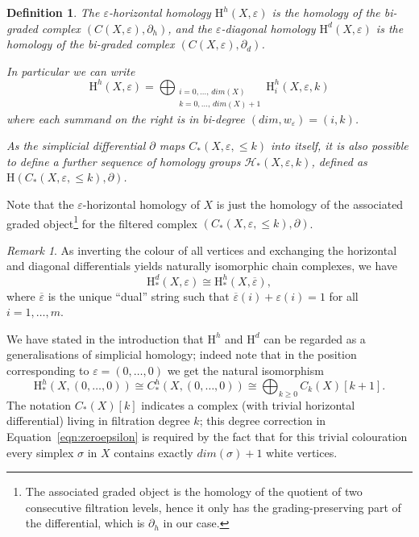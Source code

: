 \documentclass[11pt, a4paper, reqno, twoside, makeidx]{amsart}
\theoremstyle{remark}
\newtheorem{rmk}{Remark}[section]
\theoremstyle{plain}
\newtheorem{defi}[thm]{Definition}
\theoremstyle{definition}
\newcommand{\HH}{\mathrm{H}}
\begin{document}
\begin{defi}\label{def:hordiag}
The \emph{$\varepsilon$-horizontal homology} $\HH^h(X,\varepsilon)$ is the homology of the bi-graded complex $\left(C(X,\varepsilon) , \partial_h \right)$, and the  
\emph{$\varepsilon$-diagonal homology} $\HH^d(X,\varepsilon)$ is the homology of the bi-graded complex $\left(C(X,\varepsilon)  , \partial_d \right)$.

In particular we can write
\begin{equation}
\HH^h(X,\varepsilon) = \bigoplus_{\substack{ i = 0, \ldots,\, dim(X) \\k = 0, \ldots,\, dim(X)+1}} \HH^h_i(X,\varepsilon,k)
\end{equation}
where each summand on the right is in bi-degree $(dim, w_\varepsilon) = (i,k)$.

As the simplicial differential $\partial$ maps $C_*(X,\varepsilon,  \le k)$ into itself,  it is also possible to define a further sequence of homology groups $\mathcal{H}_*(X,\varepsilon,k)$, defined as $\HH\left(C_*(X,\varepsilon,  \le k), \partial \right)$. 
\end{defi}

Note that the $\varepsilon$-horizontal homology of $X$ is just the homology of the associated graded object\footnote{The associated graded object is the homology of the quotient of two consecutive filtration levels, hence it only has the grading-preserving part of the differential, which is $\partial_h$ in our case.} for the filtered complex $\left(C_*(X,\varepsilon,  \le k), \partial \right)$. 

\begin{rmk}\label{rmk:isohordiag}
As inverting the colour of all vertices and exchanging the horizontal and diagonal differentials yields naturally isomorphic chain complexes, we have $$\HH^d_*(X, \varepsilon) \cong \HH^h_*(X,\overline{\varepsilon}),$$ where $\overline{\varepsilon}$ is the unique ``dual'' string such that $\overline{\varepsilon}(i) + \varepsilon(i) = 1$ for all $i = 1, \ldots, m$. 
\end{rmk}


We have stated in the introduction that $\HH^h$ and $\HH^d$ can be regarded as a generalisations of simplicial homology; indeed note that in the position corresponding to $\varepsilon = (0,\ldots, 0)$ we get the natural isomorphism
\begin{equation}\label{eqn:zeroepsilon}
\HH^h_*(X,(0,\ldots, 0)) \cong C^h_*(X,(0,\ldots, 0))  \cong \bigoplus_{k \ge 0} C_k(X)[k+1].
\end{equation}
The notation $C_*(X)[k]$ indicates a complex (with trivial horizontal differential) living in filtration degree $k$; this degree correction in Equation~\eqref{eqn:zeroepsilon} is required by the fact that  for this trivial colouration every simplex $\sigma$ in $X$ contains exactly $dim(\sigma) +1$ white vertices.
\end{document}
